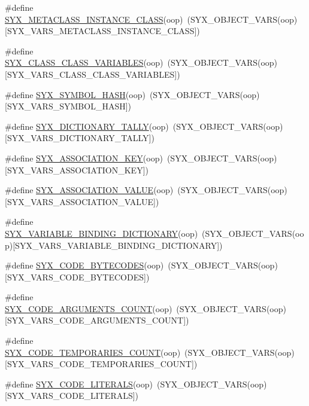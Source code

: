 \begin{CompactItemize}
\item 
\#define \hyperlink{syx-object_8h_b45ebeb40447a8043cdab82455f73475}{SYX\_\-METACLASS\_\-INSTANCE\_\-CLASS}(oop)~(SYX\_\-OBJECT\_\-VARS(oop)\mbox{[}SYX\_\-VARS\_\-METACLASS\_\-INSTANCE\_\-CLASS\mbox{]})
\item 
\#define \hyperlink{syx-object_8h_53a52a78223a9b7b0e41326bb85500d7}{SYX\_\-CLASS\_\-CLASS\_\-VARIABLES}(oop)~(SYX\_\-OBJECT\_\-VARS(oop)\mbox{[}SYX\_\-VARS\_\-CLASS\_\-CLASS\_\-VARIABLES\mbox{]})
\item 
\#define \hyperlink{syx-object_8h_e536b120cd5e071ff38023aa29045768}{SYX\_\-SYMBOL\_\-HASH}(oop)~(SYX\_\-OBJECT\_\-VARS(oop)\mbox{[}SYX\_\-VARS\_\-SYMBOL\_\-HASH\mbox{]})
\item 
\#define \hyperlink{syx-object_8h_9a20885f5a52f4bc0b7a79eb39e8b96e}{SYX\_\-DICTIONARY\_\-TALLY}(oop)~(SYX\_\-OBJECT\_\-VARS(oop)\mbox{[}SYX\_\-VARS\_\-DICTIONARY\_\-TALLY\mbox{]})
\item 
\#define \hyperlink{syx-object_8h_96eb58398db62043c949d60b43a640d3}{SYX\_\-ASSOCIATION\_\-KEY}(oop)~(SYX\_\-OBJECT\_\-VARS(oop)\mbox{[}SYX\_\-VARS\_\-ASSOCIATION\_\-KEY\mbox{]})
\item 
\#define \hyperlink{syx-object_8h_30f472220bcb98f2882f5ad89bd7480e}{SYX\_\-ASSOCIATION\_\-VALUE}(oop)~(SYX\_\-OBJECT\_\-VARS(oop)\mbox{[}SYX\_\-VARS\_\-ASSOCIATION\_\-VALUE\mbox{]})
\item 
\#define \hyperlink{syx-object_8h_dda1b5610b8bfa9ae2eb8928fc3db518}{SYX\_\-VARIABLE\_\-BINDING\_\-DICTIONARY}(oop)~(SYX\_\-OBJECT\_\-VARS(oop)\mbox{[}SYX\_\-VARS\_\-VARIABLE\_\-BINDING\_\-DICTIONARY\mbox{]})
\item 
\#define \hyperlink{syx-object_8h_71157b1d4bedfbd25c8436122ddb24fd}{SYX\_\-CODE\_\-BYTECODES}(oop)~(SYX\_\-OBJECT\_\-VARS(oop)\mbox{[}SYX\_\-VARS\_\-CODE\_\-BYTECODES\mbox{]})
\item 
\#define \hyperlink{syx-object_8h_b5c4f1e16d1d4ac619621ab96b12d009}{SYX\_\-CODE\_\-ARGUMENTS\_\-COUNT}(oop)~(SYX\_\-OBJECT\_\-VARS(oop)\mbox{[}SYX\_\-VARS\_\-CODE\_\-ARGUMENTS\_\-COUNT\mbox{]})
\item 
\#define \hyperlink{syx-object_8h_4acfab65c2c72d409325dc662d34dc5b}{SYX\_\-CODE\_\-TEMPORARIES\_\-COUNT}(oop)~(SYX\_\-OBJECT\_\-VARS(oop)\mbox{[}SYX\_\-VARS\_\-CODE\_\-TEMPORARIES\_\-COUNT\mbox{]})
\item 
\#define \hyperlink{syx-object_8h_b1a48ee5d3b0c5e48a11450c343a0f29}{SYX\_\-CODE\_\-LITERALS}(oop)~(SYX\_\-OBJECT\_\-VARS(oop)\mbox{[}SYX\_\-VARS\_\-CODE\_\-LITERALS\mbox{]})
\item 

\end{CompactItemize}
